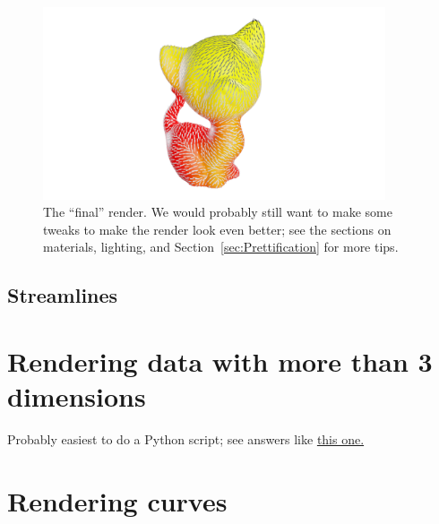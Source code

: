 \documentclass[10pt]{article}
\begin{document}
\begin{enumerate}
    \begin{figure}[H]
        \centering
        \captionsetup{width=0.8\textwidth}
        \includegraphics[width=0.9\textwidth]{images/vector_field_final_render.png}
        \caption{The ``final'' render. We would probably still want to make some tweaks to make the render look even better; see the sections on materials, lighting, and Section~\ref{sec:Prettification} for more tips.}
    \end{figure}
\end{enumerate}

\subsection{Streamlines}

\section{Rendering data with more than 3 dimensions}
Probably easiest to do a Python script; see answers like \href{https://blender.stackexchange.com/a/118494}{this one.}

\section{Rendering curves}
\end{document}
